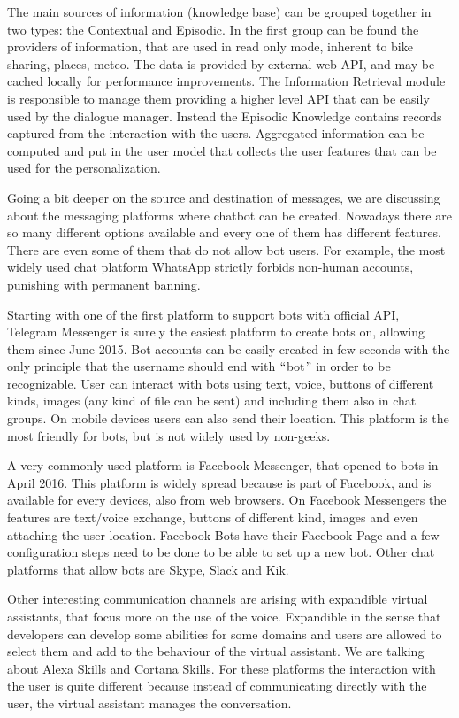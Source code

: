 The main sources of information (knowledge base) can be grouped together in two types: the Contextual and Episodic. In the first group can be found the providers of information, that are used in read only mode, inherent to bike sharing, places, meteo. The data is provided by external web API, and may be cached locally for performance improvements. The Information Retrieval module is responsible to manage them providing a higher level API that can be easily used by the dialogue manager. Instead the Episodic Knowledge contains records captured from the interaction with the users. Aggregated information can be computed and put in the user model that collects the user features that can be used for the personalization.

Going a bit deeper on the source and destination of messages, we are discussing about the messaging platforms where chatbot can be created. Nowadays there are so many different options available and every one of them has different features. There are even some of them that do not allow bot users. For example, the most widely used chat platform WhatsApp strictly forbids non-human accounts, punishing with permanent banning.

Starting with one of the first platform to support bots with official API, Telegram Messenger is surely the easiest platform to create bots on, allowing them since June 2015. Bot accounts can be easily created in few seconds with the only principle that the username should end with $``$bot$"$  in order to be recognizable. User can interact with bots using text, voice, buttons of different kinds, images (any kind of file can be sent) and including them also in chat groups. On mobile devices users can also send their location. This platform is the most friendly for bots, but is not widely used by non-geeks.

A very commonly used platform is Facebook Messenger, that opened to bots in April 2016. This platform is widely spread because is part of Facebook, and is available for every devices, also from web browsers. On Facebook Messengers the features are text/voice exchange, buttons of different kind, images and even attaching the user location. Facebook Bots have their Facebook Page and a few configuration steps need to be done to be able to set up a new bot. Other chat platforms that allow bots are Skype, Slack and Kik.

Other interesting communication channels are arising with expandible virtual assistants, that focus more on the use of the voice. Expandible in the sense that developers can develop some abilities for some domains and users are allowed to select them and add to the behaviour of the virtual assistant. We are talking about Alexa Skills and Cortana Skills. For these platforms the interaction with the user is quite different because instead of communicating directly with the user, the virtual assistant manages the conversation.

